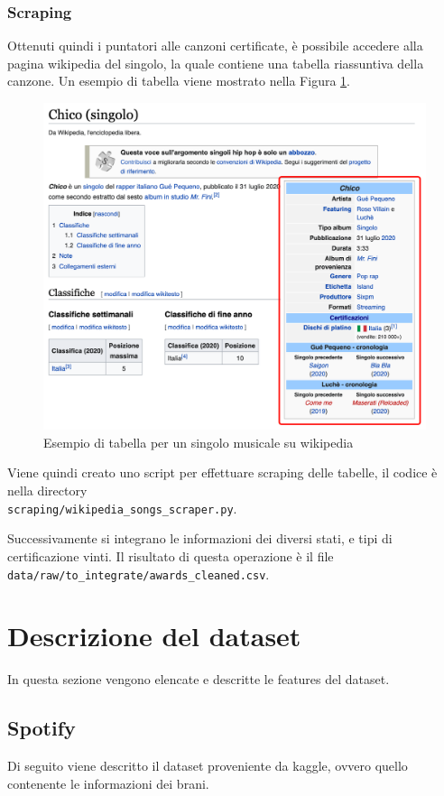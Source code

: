 \subsubsection{Scraping}
Ottenuti quindi i puntatori alle canzoni certificate, è possibile accedere alla pagina wikipedia del singolo, la quale contiene una tabella riassuntiva della canzone. Un esempio di tabella viene mostrato nella Figura \ref{fig:wiki_table}.
\begin{figure}[H]
	\centering
	\includegraphics[width=12cm]{assets/wikipedia-table.png}
	\caption{Esempio di tabella per un singolo musicale su wikipedia}
	\label{fig:wiki_table}
\end{figure}

Viene quindi creato uno script per effettuare scraping delle tabelle, il codice è nella directory\\ \verb|scraping/wikipedia_songs_scraper.py|.

Successivamente si integrano le informazioni dei diversi stati, e tipi di certificazione vinti. Il risultato di questa operazione è il file \verb|data/raw/to_integrate/awards_cleaned.csv|.

\section{Descrizione del dataset}
In questa sezione vengono elencate e descritte le features del dataset.
\subsection{Spotify}
\label{sec:descrizione_spotify}
Di seguito viene descritto il dataset proveniente da kaggle, ovvero quello contenente le informazioni dei brani.

